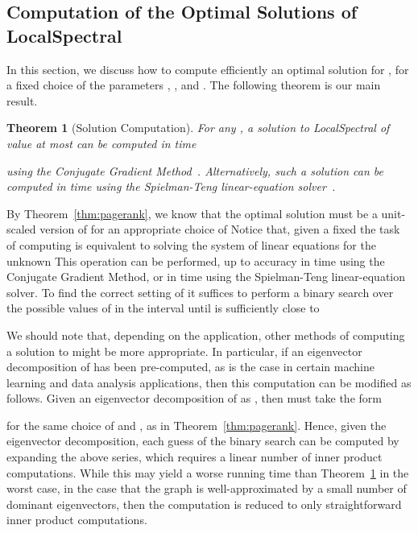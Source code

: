 \documentclass[11pt]{article}
\newtheorem{theorem}{Theorem}
\newenvironment{proof}{\noindent {\em Proof:}}{\\\hspace*{\fill}\mbox{}}
\begin{document}
\subsection{Computation of the Optimal Solutions of \textsf{LocalSpectral}}
\label{sxn:optimize-comp}

In this section, we discuss how to compute efficiently an optimal solution
for , for a fixed choice of the 
parameters , , and . 
The following theorem is our main result.

\begin{theorem}[Solution Computation]
\label{thm:comp}
For any , a solution to \textsf{LocalSpectral} 
of value at most  can be 
computed in time 
 
using the Conjugate Gradient Method~\cite{GVL96}. 
Alternatively, such a solution can be computed in time 
 using the Spielman-Teng 
linear-equation solver~\cite{Spielman:2004}. 
\end{theorem}
\begin{proof}
By Theorem~\ref{thm:pagerank}, we know that the optimal solution  must be a unit-scaled version of 
 for an appropriate choice of 
Notice that, given a fixed  the task of computing  is equivalent to solving the system of linear equations
 for the unknown  This operation can be performed, up to accuracy  in time  
using the Conjugate Gradient Method, or  in time 
 using the Spielman-Teng linear-equation 
solver.
To find the correct setting of  it suffices to perform a binary search over the possible values of  in the interval  until  is sufficiently close to  
\end{proof}

\noindent
We should note that, depending on the application, other methods of 
computing a solution to  might be more 
appropriate.
In particular, if an eigenvector decomposition of  has been 
pre-computed, as is the case in certain machine learning and data analysis 
applications, then this computation can be modified as follows.
Given an eigenvector decomposition of  as 
, then
 must take the form

for the same choice of  and , as in Theorem~\ref{thm:pagerank}. 
Hence, given the eigenvector decomposition, each guess  of the 
binary search can be computed by expanding the above series, which requires 
a linear number of inner product computations.
While this may yield a worse running time than Theorem~\ref{thm:comp} in 
the worst case, in the case that the graph is well-approximated by a small 
number  of dominant eigenvectors, then the computation is reduced to 
only  straightforward inner product computations.
\end{document}
